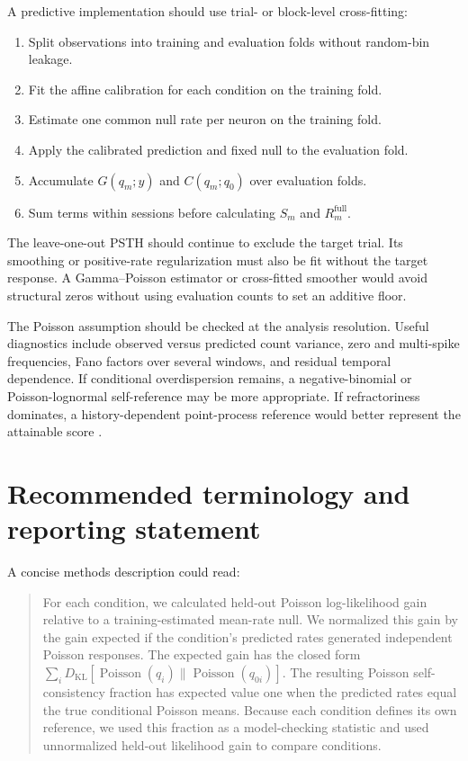 \documentclass[11pt]{article}
\newcommand{\Pois}{\operatorname{Poisson}}
\begin{document}
A predictive implementation should use trial- or block-level cross-fitting:
\begin{enumerate}
    \item Split observations into training and evaluation folds without random-bin leakage.
    \item Fit the affine calibration for each condition on the training fold.
    \item Estimate one common null rate per neuron on the training fold.
    \item Apply the calibrated prediction and fixed null to the evaluation fold.
    \item Accumulate $G(q_m;y)$ and $C(q_m;q_0)$ over evaluation folds.
    \item Sum terms within sessions before calculating $S_m$ and $R_m^{\mathrm{full}}$.
\end{enumerate}
The leave-one-out PSTH should continue to exclude the target trial. Its smoothing or positive-rate regularization must also be fit without the target response. A Gamma--Poisson estimator or cross-fitted smoother would avoid structural zeros without using evaluation counts to set an additive floor.

The Poisson assumption should be checked at the analysis resolution. Useful diagnostics include observed versus predicted count variance, zero and multi-spike frequencies, Fano factors over several windows, and residual temporal dependence. If conditional overdispersion remains, a negative-binomial or Poisson-lognormal self-reference may be more appropriate. If refractoriness dominates, a history-dependent point-process reference would better represent the attainable score \cite{brown2002,taouali2016}.

\section{Recommended terminology and reporting statement}

A concise methods description could read:

\begin{quote}
For each condition, we calculated held-out Poisson log-likelihood gain relative to a training-estimated mean-rate null. We normalized this gain by the gain expected if the condition's predicted rates generated independent Poisson responses. The expected gain has the closed form $\sum_i D_{\mathrm{KL}}[\Pois(q_i)\|\Pois(q_{0i})]$. The resulting Poisson self-consistency fraction has expected value one when the predicted rates equal the true conditional Poisson means. Because each condition defines its own reference, we used this fraction as a model-checking statistic and used unnormalized held-out likelihood gain to compare conditions.
\end{quote}
\end{document}
